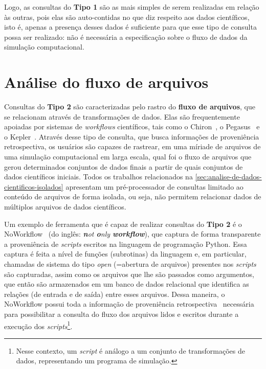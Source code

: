 Logo, as consultas do \textbf{Tipo 1} são as mais simples de serem realizadas em relação às outras, pois elas são auto-contidas no que diz respeito aos dados científicos, isto é, apenas a presença desses dados é suficiente para que esse tipo de consulta possa ser realizado: não é necessária a especificação sobre o fluxo de dados da simulação computacional.

\section{Análise do fluxo de arquivos}%
\label{sec:rastreamento-de-fluxos-de-arquivos}

Consultas do \textbf{Tipo 2} são caracterizadas pelo rastro do \textbf{fluxo de arquivos}, que se relacionam através de transformações de dados. Elas são frequentemente apoiadas por sistemas de \textit{workflows} científicos, tais como o Chiron~\cite{ogasawara2011algebraic}, o Pegasus~\cite{deelman2005pegasus} e o Kepler~\cite{ludascher2006scientific}. Através desse tipo de consulta, que busca informações de proveniência retrospectiva, os usuários são capazes de rastrear, em uma míriade de arquivos de uma simulação computacional em larga escala, qual foi o fluxo de arquivos que gerou determinados conjuntos de dados finais a partir de quais conjuntos de dados científicos iniciais. Todos os trabalhos relacionados na \ref{sec:analise-de-dados-cientificos-isolados} apresentam um pré-processador de consultas limitado ao conteúdo de arquivos de forma isolada, ou seja, não permitem relacionar dados de múltiplos arquivos de dados científicos.

Um exemplo de ferramenta que é capaz de realizar consultas do \textbf{Tipo 2} é o NoWorkflow~\cite{murta2014noworkflow} (do inglês: \textit{\textbf{n}ot \textbf{o}nly \textbf{workflow}}), que captura de forma transparente a proveniência de \textit{scripts} escritos na linguagem de programação Python. Essa captura é feita a nível de funções (subrotinas) da linguagem e, em particular, chamadas de sistema do tipo \emph{open} (=abertura de arquivos) presentes nos \textit{scripts} são capturadas, assim como os arquivos que lhe são passados como argumentos, que então são armazenados em um banco de dados relacional que identifica as relações (de entrada e de saída) entre esses arquivos. Dessa maneira, o NoWorkflow possui toda a informação de proveniência retrospectiva~\cite{Pimentel2016} necessária para possibilitar a consulta do fluxo dos arquivos lidos e escritos durante a execução dos \textit{scripts}\footnote{Nesse contexto, um \textit{script} é análogo a um conjunto de transformações de dados, representando um programa de simulação.}.

